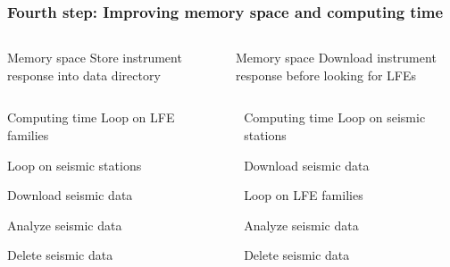 \documentclass{beamer}
\begin{document}
	\begin{frame}
		\frametitle{Fourth step: Improving memory space and computing time}
		\begin{columns}[c]
			\begin{column}{5cm}
				\begin{block}{Memory space}
				Store instrument response into data directory
				\end{block}
			\end{column}
			\begin{column}{1cm}
				\centering
				\Huge\pointer
			\end{column}
			\begin{column}{5cm}
				\begin{block}{Memory space}
				Download instrument response before looking for LFEs
				\end{block}
			\end{column}
		\end{columns}

		\vspace{1cm}

		\begin{columns}[c]
			\begin{column}{5cm}
				\begin{block}{Computing time}
				Loop on LFE families

				\hspace{5mm} Loop on seismic stations

				\hspace{1cm} Download seismic data

				\hspace{5mm} Analyze seismic data

				\hspace{5mm} Delete seismic data
				\end{block}
			\end{column}
			\begin{column}{1cm}
				\centering
				\Huge\pointer
			\end{column}
			\begin{column}{5cm}
				\begin{block}{Computing time}
				Loop on seismic stations

				\hspace{5mm} Download seismic data

				Loop on LFE families

				\hspace{5mm} Analyze seismic data

				Delete seismic data
				\end{block}
			\end{column}
		\end{columns}
	\end{frame}
\end{document}
